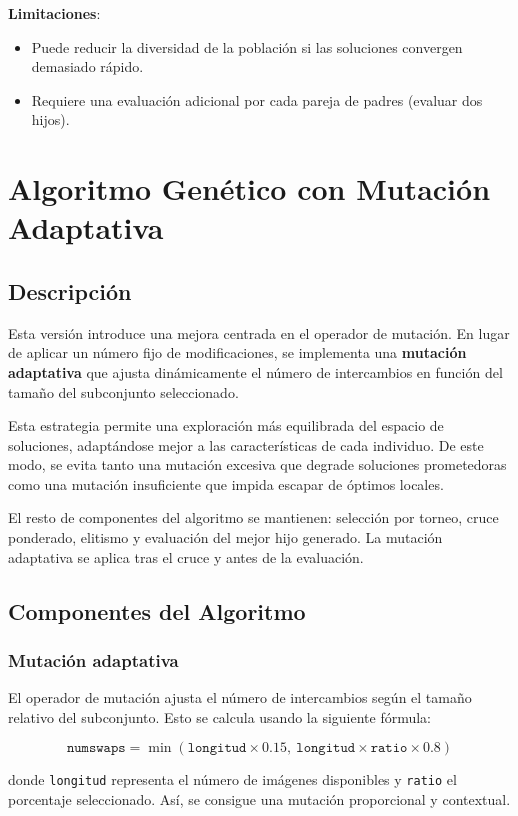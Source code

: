 \textbf{Limitaciones}:
\begin{itemize}
      \item Puede reducir la diversidad de la población si las soluciones convergen demasiado rápido.
      \item Requiere una evaluación adicional por cada pareja de padres (evaluar dos hijos).
\end{itemize}


\section{Algoritmo Genético con Mutación Adaptativa}\label{sec:genetico-mutacion}
\subsection{Descripción}
Esta versión introduce una mejora centrada en el operador de mutación.
En lugar de aplicar un número fijo de modificaciones, se implementa una \textbf{mutación adaptativa} que ajusta
dinámicamente el número de intercambios en función del tamaño del subconjunto seleccionado.

Esta estrategia permite una exploración más equilibrada del espacio de soluciones, adaptándose mejor a las características de cada individuo.
De este modo, se evita tanto una mutación excesiva que degrade soluciones prometedoras como una mutación insuficiente que impida escapar de óptimos locales.

El resto de componentes del algoritmo se mantienen: selección por torneo, cruce ponderado, elitismo y evaluación del mejor hijo generado.
La mutación adaptativa se aplica tras el cruce y antes de la evaluación.

\subsection{Componentes del Algoritmo}
\subsubsection{Mutación adaptativa}
El operador de mutación ajusta el número de intercambios según el tamaño relativo del subconjunto.
Esto se calcula usando la siguiente fórmula:

$$
      \texttt{numswaps} = \min\left(\texttt{longitud} \times 0.15,\ \texttt{longitud} \times \texttt{ratio} \times 0.8\right)
$$

donde \texttt{longitud} representa el número de imágenes disponibles y \texttt{ratio} el porcentaje seleccionado.
Así, se consigue una mutación proporcional y contextual.

